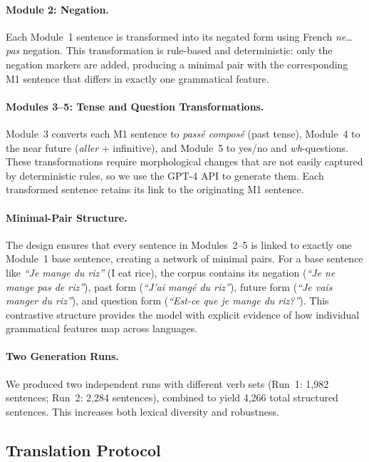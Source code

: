 \documentclass[11pt]{article}
\begin{document}
\paragraph{Module 2: Negation.} Each Module~1 sentence is transformed into its negated form using French \emph{ne\ldots pas} negation. This transformation is rule-based and deterministic: only the negation markers are added, producing a minimal pair with the corresponding M1 sentence that differs in exactly one grammatical feature.

\paragraph{Modules 3--5: Tense and Question Transformations.} Module~3 converts each M1 sentence to \emph{pass\'{e} compos\'{e}} (past tense), Module~4 to the near future (\emph{aller} + infinitive), and Module~5 to yes/no and \emph{wh}-questions. These transformations require morphological changes that are not easily captured by deterministic rules, so we use the GPT-4 API to generate them. Each transformed sentence retains its link to the originating M1 sentence.

\paragraph{Minimal-Pair Structure.} The design ensures that every sentence in Modules~2--5 is linked to exactly one Module~1 base sentence, creating a network of minimal pairs. For a base sentence like \emph{``Je mange du riz''} (I eat rice), the corpus contains its negation (\emph{``Je ne mange pas de riz''}), past form (\emph{``J'ai mang\'{e} du riz''}), future form (\emph{``Je vais manger du riz''}), and question form (\emph{``Est-ce que je mange du riz?''}). This contrastive structure provides the model with explicit evidence of how individual grammatical features map across languages.

\paragraph{Two Generation Runs.} We produced two independent runs with different verb sets (Run~1: 1,982 sentences; Run~2: 2,284 sentences), combined to yield 4,266 total structured sentences. This increases both lexical diversity and robustness.

\subsection{Translation Protocol}
\end{document}
